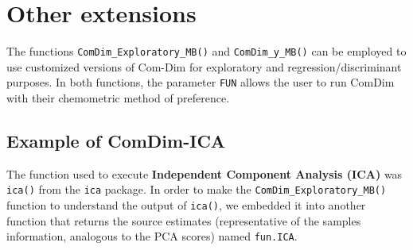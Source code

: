 \documentclass[
]{book}
\newenvironment{Shaded}{\begin{snugshade}}{\end{snugshade}}
\newcommand{\AttributeTok}[1]{\textcolor[rgb]{0.77,0.63,0.00}{#1}}
\newcommand{\CommentTok}[1]{\textcolor[rgb]{0.56,0.35,0.01}{\textit{#1}}}
\newcommand{\ControlFlowTok}[1]{\textcolor[rgb]{0.13,0.29,0.53}{\textbf{#1}}}
\newcommand{\DecValTok}[1]{\textcolor[rgb]{0.00,0.00,0.81}{#1}}
\newcommand{\FunctionTok}[1]{\textcolor[rgb]{0.00,0.00,0.00}{#1}}
\newcommand{\NormalTok}[1]{#1}
\newcommand{\OtherTok}[1]{\textcolor[rgb]{0.56,0.35,0.01}{#1}}
\newcommand{\SpecialCharTok}[1]{\textcolor[rgb]{0.00,0.00,0.00}{#1}}
\newcommand{\StringTok}[1]{\textcolor[rgb]{0.31,0.60,0.02}{#1}}
\begin{document}
\hypertarget{Other}{%
\section{Other extensions}\label{Other}}

The functions \texttt{ComDim\_Exploratory\_MB()} and \texttt{ComDim\_y\_MB()} can be employed to
use customized versions of Com-Dim for exploratory and regression/discriminant
purposes. In both functions, the parameter \texttt{FUN} allows the user to run ComDim
with their chemometric method of preference.

\hypertarget{example-of-comdim-ica}{%
\subsection{Example of ComDim-ICA}\label{example-of-comdim-ica}}

The function used to execute \textbf{Independent Component Analysis (ICA)} was
\texttt{ica()} from the \texttt{ica} package.
In order to make the \texttt{ComDim\_Exploratory\_MB()} function to understand the output
of \texttt{ica()}, we embedded it into another function that returns the source
estimates (representative of the samples information, analogous to the PCA
scores) named \texttt{fun.ICA}.

\begin{Shaded}
\end{Shaded}
\end{document}
